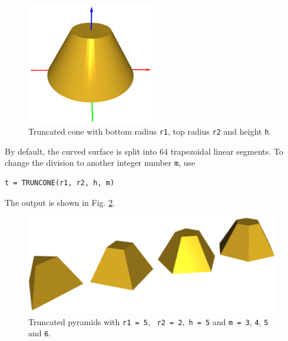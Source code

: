 \begin{figure}[!ht]
\begin{center}
\includegraphics[width=0.5\textwidth]{img/truncone-1.png}
\end{center}
\vspace{-6mm}
\caption{Truncated cone with bottom radius {\tt r1}, top radius {\tt r2}
and height {\tt h}.}
\label{fig:tcone}
\end{figure}
\noindent
By default, the curved surface is split into 64 trapezoidal linear segments. 
To change the division to another integer number {\tt m}, use\\

\begin{bbox}
\begin{verbatim}
t = TRUNCONE(r1, r2, h, m)
\end{verbatim}
\end{bbox}
\vspace{6mm}

\noindent
The output is shown in Fig. \ref{fig:tcone-9}.

\begin{figure}[!ht]
\begin{center}
\includegraphics[width=0.99\textwidth]{img/tpyrams-111.png}
\end{center}
\vspace{-6mm}
\caption{Truncated pyramids with {\tt r1 = 5}, \, {\tt r2 = 2},\,
{\tt h = 5} and {\tt m = 3}, {\tt 4}, {\tt 5} and {\tt 6}.}
\label{fig:tcone-9}
\vspace{-1cm}
\end{figure}
\newpage


